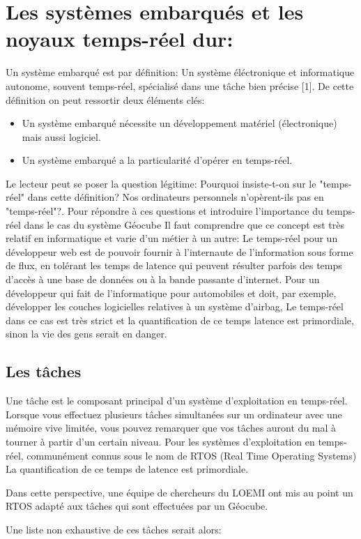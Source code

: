 \documentclass{themeensg}
\begin{document}
\section{Les systèmes embarqués et les noyaux temps-réel dur:}
Un système embarqué est par définition: Un système éléctronique et informatique autonome, souvent temps-réel, spécialisé dans une tâche bien précise [1]. De cette définition on peut ressortir deux éléments clés:
\begin{itemize}
\item Un système embarqué nécessite un développement matériel (électronique) mais aussi logiciel.
\item Un système embarqué a la particularité d'opérer en temps-réel.
\end{itemize}
Le lecteur peut se poser la question légitime: Pourquoi insiste-t-on sur le "temps-réel" dans cette définition? Nos ordinateurs personnels n'opèrent-ils pas en "temps-réel"?. Pour répondre à ces questions et introduire l'importance du temps-réel dans le cas du système Géocube Il faut comprendre que ce concept est très relatif en informatique et varie d'un métier à un autre: Le temps-réel pour un développeur web est de pouvoir fournir à l'internaute de l'information sous forme de flux, en tolérant les temps de latence qui peuvent résulter parfois des temps d'accès à une base de données ou à la bande passante d'internet. Pour un développeur qui fait de l'informatique pour automobiles et doit, par exemple, développer les couches logicielles relatives à un système d'airbag, Le temps-réel dans ce cas est très strict et la quantification de ce temps latence est primordiale, sinon la vie des gens serait en danger.
\subsection{Les tâches}
Une tâche est le composant principal d'un système d'exploitation en temps-réel. Lorsque vous effectuez plusieurs tâches simultanées sur un ordinateur avec une mémoire vive limitée, vous pouvez remarquer que vos tâches auront du mal à tourner à partir d'un certain niveau. Pour les systèmes d'exploitation en temps-réel, communément connus sous le nom de RTOS (Real Time Operating Systems) La quantification de ce temps de latence est primordiale.

Dans cette perspective, une équipe de chercheurs du LOEMI ont mis au point un RTOS adapté aux tâches qui sont effectuées par un Géocube.

Une liste non exhaustive de ces tâches serait alors:
\end{document}
